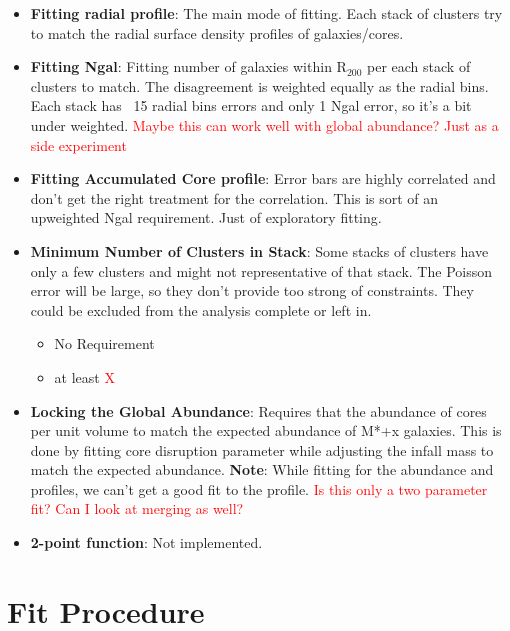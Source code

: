 \documentclass[twocolumn]{article}
\newcommand\mynotes[1]{\textcolor{red}{#1}}
\begin{document}
\begin{itemize}
  
\item \textbf{Fitting radial profile}: The main mode of fitting. Each
  stack of clusters try to match the radial surface density profiles
  of galaxies/cores.
  
\item \textbf{Fitting Ngal}: Fitting number of galaxies within
  R$_{200}$ per each stack of clusters to match. The disagreement is
  weighted equally as the radial bins. Each stack has ~15 radial bins
  errors and only 1 Ngal error, so it's a bit under
  weighted. \mynotes{Maybe this can work well with global abundance? Just as a
    side experiment}

  
\item \textbf{Fitting Accumulated Core profile}: Error bars are highly
  correlated and don't get the right treatment for the correlation. This is
  sort of an upweighted Ngal requirement. Just of exploratory fitting.
  

\item \textbf{Minimum Number of Clusters in Stack}: Some stacks of
  clusters have only a few clusters and might not representative of
  that stack. The Poisson error will be large, so they don't provide
  too strong of constraints. They could be excluded from the analysis
  complete or left in.
  \begin{itemize}
    \item No Requirement
    \item at least \mynotes{X}
  \end{itemize}


\item \textbf{Locking the Global Abundance}: Requires that the
  abundance of cores per unit volume to match the expected abundance
  of M*+x galaxies. This is done by fitting core disruption parameter
  while adjusting the infall mass to match the expected
  abundance. \textbf{Note}: While fitting for the abundance and
  profiles, we can't get a good fit to the profile. \mynotes{Is this
    only a two parameter fit? Can I look at merging as well?}
  
\item \textbf{2-point function}: Not implemented. 


\end{itemize}

\section{Fit Procedure}
\end{document}
